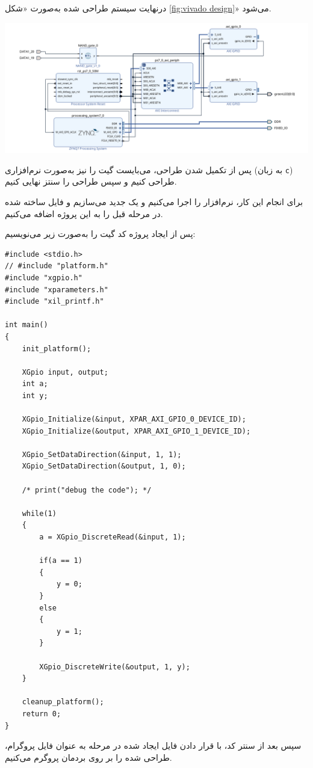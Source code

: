 درنهایت سیستم طراحی شده به‌صورت «شکل \ref{fig:vivado design}» می‌شود. 

\begin{center}
	\includegraphics*[width=1\linewidth]{pics/img3.png}
	\label{fig:vivado design}
\end{center}

پس از تکمیل شدن طراحی، می‌بایست گیت  را نیز به‌صورت نرم‌افزاری (به زبان \texttt{c}) طراحی کنیم و سپس طراحی را سنتز نهایی کنیم.

برای انجام این کار، نرم‌افزار  را اجرا می‌کنیم و یک  جدید می‌سازیم و فایل \texttt{} ساخته شده در  مرحله قبل را به این پروژه اضافه می‌کنیم.

پس از ایجاد پروژه کد گیت  را به‌صورت زیر می‌نویسیم:

\begin{latin}
\begin{lstlisting}[label=case_sens, caption=AND Module for PL]
#include <stdio.h>
// #include "platform.h"
#include "xgpio.h"
#include "xparameters.h"
#include "xil_printf.h"

int main()
{
	init_platform();
	
	XGpio input, output;
	int a;
	int y;
	
	XGpio_Initialize(&input, XPAR_AXI_GPIO_0_DEVICE_ID);
	XGpio_Initialize(&output, XPAR_AXI_GPIO_1_DEVICE_ID);
	
	XGpio_SetDataDirection(&input, 1, 1);
	XGpio_SetDataDirection(&output, 1, 0);
	
	/* print("debug the code"); */
	
	while(1)
	{
		a = XGpio_DiscreteRead(&input, 1);
		
		if(a == 1)
		{
			y = 0;
		}
		else
		{
			y = 1;
		}
		
		XGpio_DiscreteWrite(&output, 1, y);
	}
	
	cleanup_platform();
	return 0;
}
\end{lstlisting} 
\end{latin}



سپس بعد از سنتر کد، با قرار دادن فایل  ایجاد شده در مرحله  به عنوان فایل پروگرام، طراحی  شده را بر روی بردمان پروگرم می‌کنیم.



